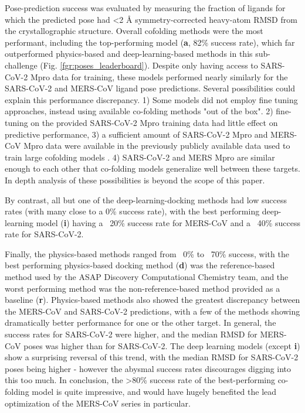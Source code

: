 \documentclass[journal=jcim,manuscript=article]{achemso}
\begin{document}
Pose-prediction success was evaluated by measuring the fraction of ligands for which the predicted pose had \textless 2 Å symmetry-corrected heavy-atom RMSD from the crystallographic structure. Overall cofolding methods were the most performant, including the top-performing model (\textbf{a}, 82\% success rate), which far outperformed physics-based and deep-learning-based methods in this sub-challenge (Fig. \ref{fgr:poses_leaderboard}). 
Despite only having access to SARS-CoV-2 Mpro data for training, these models performed nearly similarly for the SARS-CoV-2 and MERS-CoV ligand pose predictions. Several possibilities could explain this performance discrepancy. 1) Some models did not employ fine tuning approaches, instead using available co-folding methods "out of the box". 2) fine-tuning on the provided SARS-CoV-2 Mpro training data had little effect on predictive performance, 3) a sufficient amount of SARS-CoV-2 Mpro and MERS-CoV Mpro data were available in the previously publicly available data used to train large cofolding models . 4) SARS-CoV-2 and MERS Mpro are similar enough to each other that co-folding models generalize well between these targets. In depth analysis of these possibilities is beyond the scope of this paper.

By contrast, all but one of the deep-learning-docking methods had low success rates (with many close to a 0\% success rate), with the best performing deep-learning model (\textbf{i}) having a ~20\% success rate for MERS-CoV and a ~40\% success rate for SARS-CoV-2.

Finally, the physics-based methods ranged from ~0\% to ~70\% success, with the best performing physics-based docking method (\textbf{d}) was the reference-based method used by the ASAP Discovery Computational Chemistry team, and the worst performing method was the non-reference-based method provided as a baseline (\textbf{r}). Physics-based methods also showed the greatest discrepancy between the MERS-CoV and SARS-CoV-2 predictions, with a few of the methods showing dramatically better performance for one or the other target. In general, the success rates for SARS-CoV-2 were higher, and the median RMSD for MERS-CoV poses was higher than for SARS-CoV-2. 
The deep learning models (except \textbf{i}) show a surprising reversal of this trend, with the median RMSD for SARS-CoV-2 poses being higher - however the abysmal success rates discourages digging into this too much. 
In conclusion, the \textgreater 80\% success rate of the best-performing co-folding model is quite impressive, and would have hugely benefited the lead optimization of the MERS-CoV series in particular.
\end{document}
